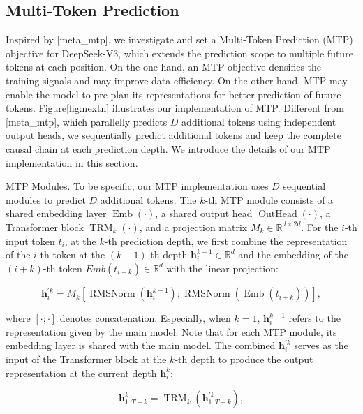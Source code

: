 \documentclass[11pt,a4paper]{article}
\begin{document}
\subsection{Multi-Token Prediction}

Inspired by [meta\_mtp], we investigate and set a Multi-Token Prediction (MTP) objective for DeepSeek-V3, which extends the prediction scope to multiple future tokens at each position. On the one hand, an MTP objective densifies the training signals and may improve data efficiency. On the other hand, MTP may enable the model to pre-plan its representations for better prediction of future tokens. Figure[fig:nextn] illustrates our implementation of MTP. Different from [meta\_mtp], which parallelly predicts $D$ additional tokens using independent output heads, we sequentially predict additional tokens and keep the complete causal chain at each prediction depth. We introduce the details of our MTP implementation in this section.

MTP Modules. To be specific, our MTP implementation uses $D$ sequential modules to predict $D$ additional tokens. The $k$-th MTP module consists of a shared embedding layer $\operatorname{Emb}(\cdot)$, a shared output head $\operatorname{OutHead}(\cdot)$, a Transformer block $\operatorname{TRM}_k(\cdot)$, and a projection matrix $M_k \in \mathbb{R}^{d \times 2d}$. For the $i$-th input token $t_i$, at the $k$-th prediction depth, we first combine the representation of the $i$-th token at the $(k-1)$-th depth $\mathbf{h}_i^{k-1} \in \mathbb{R}^{d}$ and the embedding of the $(i+k)$-th token $Emb(t_{i+k}) \in \mathbb{R}^{d}$ with the linear projection:

$$\begin{equation}
    \mathbf{h}_i^{\prime k} = M_k [\operatorname{RMSNorm}(\mathbf{h}_i^{k-1}) ; \operatorname{RMSNorm}(\operatorname{Emb}(t_{i+k}))],
\end{equation}$$

where $[\cdot ; \cdot]$ denotes concatenation. Especially, when $k=1$, $\mathbf{h}_i^{k-1}$ refers to the representation given by the main model. Note that for each MTP module, its embedding layer is shared with the main model. The combined $\mathbf{h}_i^{\prime k}$ serves as the input of the Transformer block at the $k$-th depth to produce the output representation at the current depth $\mathbf{h}_{i}^{k}$:

$$\begin{equation}
    \mathbf{h}_{1:T-k}^{k} = \operatorname{TRM}_k(\mathbf{h}_{1:T-k}^{\prime k}),
\end{equation}$$
\end{document}
